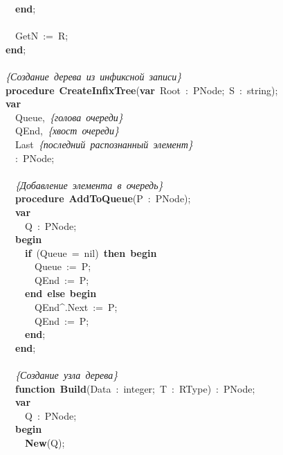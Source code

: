\mbox{}\ \ \textbf{end}; \\
\mbox{} \\
\mbox{}\ \ GetN\ :=\ R; \\
\mbox{}\textbf{end}; \\
\mbox{} \\
\mbox{}\textit{\{Создание\ дерева\ из\ инфиксной\ записи\}} \\
\mbox{}\textbf{procedure}\ \textbf{CreateInfixTree}(\textbf{var}\ Root\ :\ PNode;\ S\ :\ string); \\
\mbox{}\textbf{var} \\
\mbox{}\ \ Queue,\ \textit{\{голова\ очереди\}} \\
\mbox{}\ \ QEnd,\ \textit{\{хвост\ очереди\}} \\
\mbox{}\ \ Last\ \textit{\{последний\ распознанный\ элемент\}} \\
\mbox{}\ \ :\ PNode; \\
\mbox{} \\
\mbox{}\ \ \textit{\{Добавление\ элемента\ в\ очередь\}} \\
\mbox{}\ \ \textbf{procedure}\ \textbf{AddToQueue}(P\ :\ PNode); \\
\mbox{}\ \ \textbf{var} \\
\mbox{}\ \ \ \ Q\ :\ PNode; \\
\mbox{}\ \ \textbf{begin} \\
\mbox{}\ \ \ \ \textbf{if}\ (Queue\ =\ nil)\ \textbf{then}\ \textbf{begin} \\
\mbox{}\ \ \ \ \ \ Queue\ :=\ P; \\
\mbox{}\ \ \ \ \ \ QEnd\ :=\ P; \\
\mbox{}\ \ \ \ \textbf{end}\ \textbf{else}\ \textbf{begin} \\
\mbox{}\ \ \ \ \ \ QEnd\textasciicircum{}.Next\ :=\ P; \\
\mbox{}\ \ \ \ \ \ QEnd\ :=\ P; \\
\mbox{}\ \ \ \ \textbf{end}; \\
\mbox{}\ \ \textbf{end}; \\
\mbox{} \\
\mbox{}\ \ \textit{\{Создание\ узла\ дерева\}} \\
\mbox{}\ \ \textbf{function}\ \textbf{Build}(Data\ :\ integer;\ T\ :\ RType)\ :\ PNode; \\
\mbox{}\ \ \textbf{var} \\
\mbox{}\ \ \ \ Q\ :\ PNode; \\
\mbox{}\ \ \textbf{begin} \\
\mbox{}\ \ \ \ \textbf{New}(Q); \\
